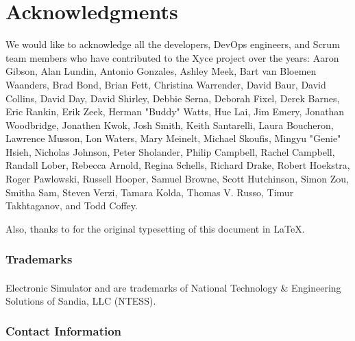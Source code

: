 


\chapter*{Acknowledgments}

We would like to acknowledge all the developers, DevOps engineers, and Scrum
team members who have contributed to the Xyce project over the years: 
Aaron Gibson,
Alan Lundin,
Antonio Gonzales,
Ashley Meek,
Bart van Bloemen Waanders,
Brad Bond,
Brian Fett,
Christina Warrender,
David Baur,
David Collins,
David Day,
David Shirley,
Debbie Serna,
Deborah Fixel,
Derek Barnes,
Eric Rankin,
Erik Zeek,
Herman "Buddy" Watts,
Hue Lai,
Jim Emery,
Jonathan Woodbridge,
Jonathen Kwok,
Josh Smith,
Keith Santarelli,
Laura Boucheron,
Lawrence Musson,
Lon Waters,
Mary Meinelt,
Michael Skoufis,
Mingyu \mbox{"Genie"} Hsieh,
Nicholas Johnson,
Peter Sholander,
Philip Campbell,
Rachel Campbell,
Randall Lober,
Rebecca Arnold,
Regina Schells,
Richard Drake,
Robert Hoekstra,
Roger Pawlowski,
Russell Hooper,
Samuel Browne,
Scott Hutchinson,
Simon Zou,
Smitha Sam,
Steven Verzi,
Tamara Kolda,
Thomas V. Russo,
Timur Takhtaganov, and
Todd Coffey.

\noindent
Also, thanks to for the original typesetting of this document in \LaTeX.

\subsection*{Trademarks}

\Xyce{} Electronic Simulator\textsuperscript{\scriptsize{\texttrademark}} and
\XyceTM{} are trademarks of National Technology \& Engineering Solutions of
Sandia, LLC (NTESS).

\subsection*{Contact Information} \label{Contact Information}

